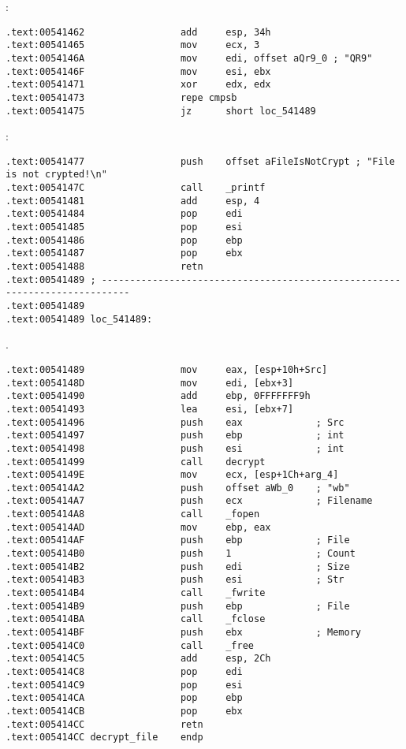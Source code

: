 :

\begin{lstlisting}
.text:00541462                 add     esp, 34h
.text:00541465                 mov     ecx, 3
.text:0054146A                 mov     edi, offset aQr9_0 ; "QR9"
.text:0054146F                 mov     esi, ebx
.text:00541471                 xor     edx, edx
.text:00541473                 repe cmpsb
.text:00541475                 jz      short loc_541489
\end{lstlisting}

:

\begin{lstlisting}
.text:00541477                 push    offset aFileIsNotCrypt ; "File is not crypted!\n"
.text:0054147C                 call    _printf
.text:00541481                 add     esp, 4
.text:00541484                 pop     edi
.text:00541485                 pop     esi
.text:00541486                 pop     ebp
.text:00541487                 pop     ebx
.text:00541488                 retn
.text:00541489 ; ---------------------------------------------------------------------------
.text:00541489
.text:00541489 loc_541489:
\end{lstlisting}

 .

\begin{lstlisting}
.text:00541489                 mov     eax, [esp+10h+Src]
.text:0054148D                 mov     edi, [ebx+3]
.text:00541490                 add     ebp, 0FFFFFFF9h
.text:00541493                 lea     esi, [ebx+7]
.text:00541496                 push    eax             ; Src
.text:00541497                 push    ebp             ; int
.text:00541498                 push    esi             ; int
.text:00541499                 call    decrypt
.text:0054149E                 mov     ecx, [esp+1Ch+arg_4]
.text:005414A2                 push    offset aWb_0    ; "wb"
.text:005414A7                 push    ecx             ; Filename
.text:005414A8                 call    _fopen
.text:005414AD                 mov     ebp, eax
.text:005414AF                 push    ebp             ; File
.text:005414B0                 push    1               ; Count
.text:005414B2                 push    edi             ; Size
.text:005414B3                 push    esi             ; Str
.text:005414B4                 call    _fwrite
.text:005414B9                 push    ebp             ; File
.text:005414BA                 call    _fclose
.text:005414BF                 push    ebx             ; Memory
.text:005414C0                 call    _free
.text:005414C5                 add     esp, 2Ch
.text:005414C8                 pop     edi
.text:005414C9                 pop     esi
.text:005414CA                 pop     ebp
.text:005414CB                 pop     ebx
.text:005414CC                 retn
.text:005414CC decrypt_file    endp
\end{lstlisting}

